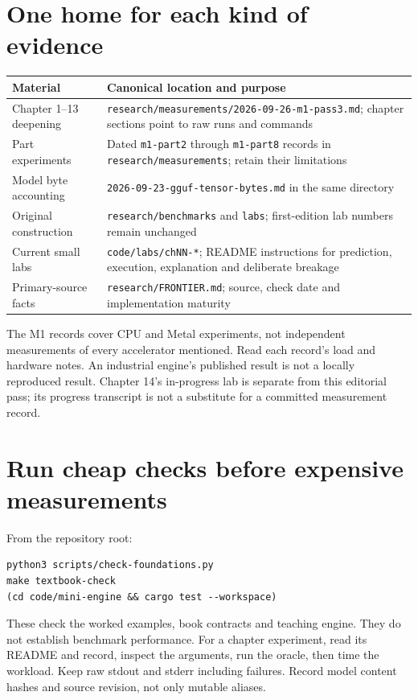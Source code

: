 \section{One home for each kind of evidence}
\begin{longtable}{@{}p{.28\linewidth}p{.63\linewidth}@{}}
\toprule Material & Canonical location and purpose\\\midrule
\endhead
Chapter 1--13 deepening & \texttt{research/measurements/2026-09-26-m1-pass3.md};
chapter sections point to raw runs and commands\\
Part experiments & Dated \texttt{m1-part2} through \texttt{m1-part8} records
in \texttt{research/measurements}; retain their limitations\\
Model byte accounting & \texttt{2026-09-23-gguf-tensor-bytes.md}
in the same directory\\
Original construction & \texttt{research/benchmarks} and \texttt{labs};
first-edition lab numbers remain unchanged\\
Current small labs & \texttt{code/labs/chNN-*}; README instructions for
prediction, execution, explanation and deliberate breakage\\
Primary-source facts & \texttt{research/FRONTIER.md}; source, check date
and implementation maturity\\
\bottomrule
\end{longtable}

The M1 records cover CPU and Metal experiments, not independent measurements
of every accelerator mentioned. Read each record's load and hardware notes.
An industrial engine's published result is not a locally reproduced result.
Chapter 14's in-progress lab is separate from this editorial pass; its
progress transcript is not a substitute for a committed measurement record.

\section{Run cheap checks before expensive measurements}
From the repository root:
\begin{verbatim}
python3 scripts/check-foundations.py
make textbook-check
(cd code/mini-engine && cargo test --workspace)
\end{verbatim}
These check the worked examples, book contracts and teaching engine.
They do not establish benchmark performance. For a chapter experiment,
read its README and record, inspect the arguments, run the oracle, then
time the workload. Keep raw stdout and stderr including failures.
Record model content hashes and source revision, not only mutable aliases.

